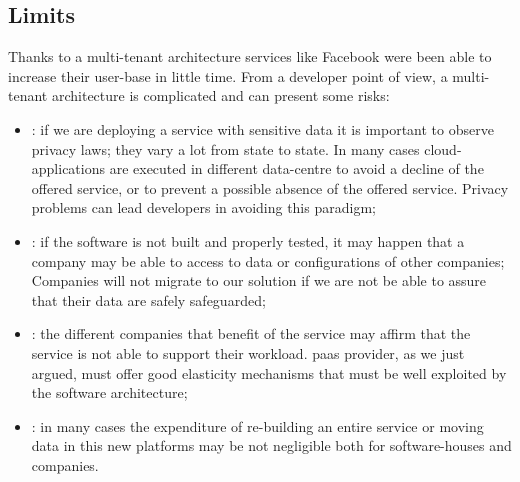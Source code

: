\subsection{Limits}
\label{sec:elasticity-multiTenancy-limits}
Thanks to a multi-tenant architecture services like Facebook were been able to increase their user-base
in little time. From a developer point of view, a multi-tenant architecture is complicated and can present
some risks:

\begin{itemize}
	\item{: if we are deploying a service with sensitive data it is important to
		observe privacy laws; they vary a lot from state to state. In many cases cloud-applications are
		executed in different data-centre to avoid a decline of the offered service, or to prevent a
		possible absence of the offered service. Privacy problems can lead developers in avoiding this paradigm;}
	\item{: if the software is not built and properly tested, it may happen that a
		company may be able to access to data or configurations of other companies; Companies will not migrate to
		our solution if we are not be able to assure that their data are safely safeguarded;}
	\item{: the different companies that benefit of the service may affirm that
		the service is not able to support their workload. \ac{paas} provider, as we just argued, must offer
		good elasticity mechanisms that must be well exploited by the software architecture;}
	\item{: in many cases the expenditure of re-building
		an entire service or moving data in this new platforms may be not negligible both for software-houses and
		companies.}
\end{itemize}